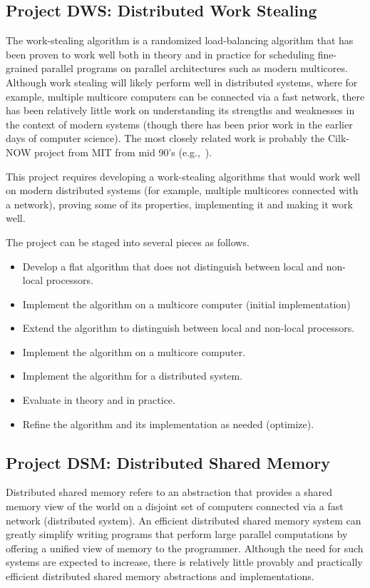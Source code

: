 \documentclass[11pt]{article}
\begin{document}
\subsection{Project DWS: Distributed Work Stealing}

The work-stealing algorithm is a randomized load-balancing algorithm
that has been proven to work well both in theory and in practice for
scheduling fine-grained parallel programs on parallel architectures
such as modern multicores.  Although work stealing will likely perform
well in distributed systems, where for example, multiple multicore
computers can be connected via a fast network, there has been
relatively little work on understanding its strengths and weaknesses
in the context of modern systems (though there has been prior work in
the earlier days of computer science).  The most closely related work
is probably the Cilk-NOW project from MIT from mid 90's
(e.g.,~\cite{BlumofeLi97}).

This project requires developing a work-stealing algorithms that would
work well on modern distributed systems (for example, multiple
multicores connected with a network), proving some of its properties,
implementing it and making it work well.

The project can be staged into several pieces as follows.
\begin{itemize}
\item Develop a flat algorithm that does not distinguish between local
  and non-local processors.
\item Implement the algorithm on a multicore computer (initial
  implementation)
\item Extend the algorithm to distinguish between local and non-local
  processors.
\item Implement the algorithm on a multicore computer.
\item Implement the algorithm for a distributed system.
\item Evaluate in theory and in practice.
\item Refine the algorithm and its implementation as needed (optimize).

\end{itemize}

\subsection{Project DSM: Distributed Shared Memory}

Distributed shared memory refers to an abstraction that provides a
shared memory view of the world on a disjoint set of computers
connected via a fast network (distributed system).  An efficient
distributed shared memory system can greatly simplify writing programs
that perform large parallel computations by offering a unified view of
memory to the programmer.  Although the need for such systems are
expected to increase, there is relatively little provably and
practically efficient distributed shared memory abstractions and
implementations.
\end{document}
